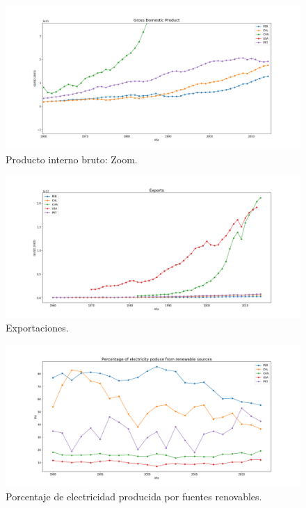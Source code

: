 \documentclass{article}
\begin{document}
\begin{figure}
	\centering
	\includegraphics[scale=0.38]{images/a.png}
	\caption{Producto interno bruto: Zoom.}
	\label{fig:7}
\end{figure}


\begin{figure}
	\centering
	\includegraphics[scale=0.38]{images/figure_1-5.png}
	\caption{Exportaciones.}
	\label{fig:8}
\end{figure}

\begin{figure}
	\centering
	\includegraphics[scale=0.38]{images/figure_1-7.png}
	\caption{Porcentaje de electricidad producida por fuentes renovables.}
	\label{fig:9}
\end{figure}
\end{document}
